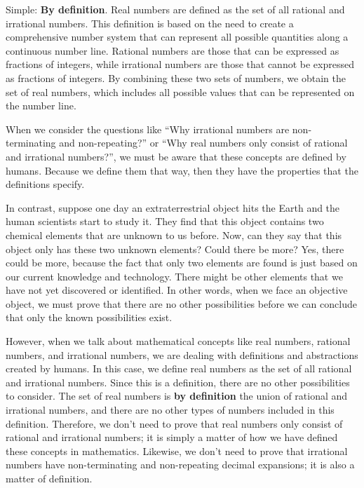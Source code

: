 \documentclass[12pt, letterpaper, oneside]{article}
\begin{document}
Simple: \textbf{By definition}. Real numbers are defined as the set of all rational and irrational numbers. This
definition is based on the need to create a comprehensive number system that can represent all possible quantities along
a continuous number line. Rational numbers are those that can be expressed as fractions of integers, while irrational
numbers are those that cannot be expressed as fractions of integers. By combining these two sets of numbers, we obtain
the set of real numbers, which includes all possible values that can be represented on the number line.

When we consider the questions like ``Why irrational numbers are non-terminating and non-repeating?'' or ``Why real
numbers only consist of rational and irrational numbers?'', we must be aware that these concepts are defined by humans.
Because we define them that way, then they have the properties that the definitions specify.

In contrast, suppose one day an extraterrestrial object hits the Earth and the human scientists start to study it. They
find that this object contains two chemical elements that are unknown to us before. Now, can they say that this object
only has these two unknown elements? Could there be more? Yes, there could be more, because the fact that only two
elements are found is just based on our current knowledge and technology. There might be other elements that we have not
yet discovered or identified. In other words, when we face an objective object, we must prove that there are no other
possibilities before we can conclude that only the known possibilities exist.

However, when we talk about mathematical concepts like real numbers, rational numbers, and irrational numbers, we are
dealing with definitions and abstractions created by humans. In this case, we define real numbers as the set of all
rational and irrational numbers. Since this is a definition, there are no other possibilities to consider. The set of
real numbers is \textbf{by definition} the union of rational and irrational numbers, and there are no other types of
numbers included in this definition. Therefore, we don't need to prove that real numbers only consist of rational and
irrational numbers; it is simply a matter of how we have defined these concepts in mathematics. Likewise, we don't need
to prove that irrational numbers have non-terminating and non-repeating decimal expansions; it is also a matter of
definition.

\end{document}
